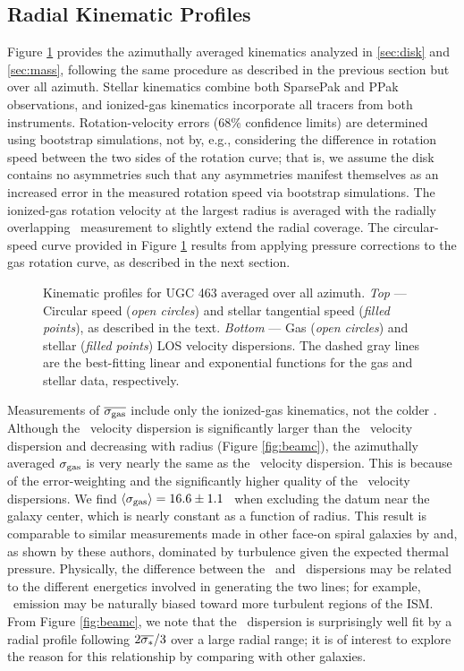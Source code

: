 \documentclass[apj,iop,numberedappendix]{emulateapj}
\begin{document}
\subsection{Radial Kinematic Profiles}
\label{sec:rcsdisp}

Figure \ref{fig:rcaxisym} provides the azimuthally averaged kinematics analyzed
in \sects \ref{sec:disk} and \ref{sec:mass}, following the same procedure as
described in the previous section but over all azimuth.  Stellar kinematics
combine both SparsePak and PPak observations, and ionized-gas kinematics
incorporate all tracers from both instruments.  Rotation-velocity errors (68\%
confidence limits) are determined using bootstrap simulations, not by, e.g.,
considering the difference in rotation speed between the two sides of the
rotation curve; that is, we assume the disk contains no asymmetries such that
any asymmetries manifest themselves as an increased error in the measured
rotation speed via bootstrap simulations.  The ionized-gas rotation velocity at
the largest radius is averaged with the radially overlapping \hone\ measurement
to slightly extend the radial coverage.  The circular-speed curve provided in
Figure \ref{fig:rcaxisym} results from applying pressure corrections to the gas
rotation curve, as described in the next section.

\begin{figure}
\caption{
%
Kinematic profiles for UGC 463 averaged over all azimuth.  {\it Top} ---
Circular speed ({\it open circles}) and stellar tangential speed ({\it filled
points}), as described in the text.  {\it Bottom} --- Gas ({\it open circles})
and stellar ({\it filled points}) LOS velocity dispersions.  The dashed gray
lines are the best-fitting linear and exponential functions for the gas and
stellar data, respectively.
%
}
\label{fig:rcaxisym}
\end{figure}

Measurements of $\overline{\sigma_{\rm gas}}$ include only the ionized-gas kinematics, not
the colder \hone.  Although the \oiii\ velocity dispersion is significantly
larger than the \halp\ velocity dispersion and decreasing with radius (Figure
\ref{fig:beamc}), the azimuthally averaged $\sigma_{\rm gas}$ is very nearly the same as
the \halp\ velocity dispersion.  This is because of the error-weighting and the
significantly higher quality of the \halp\ velocity dispersions.  We find
$\langle \sigma_{\rm gas} \rangle = 16.6\pm1.1$ \kms\ when excluding the datum near the galaxy
center, which is nearly constant as a function of radius.  This result is
comparable to similar measurements made in other face-on spiral galaxies by
\citet{2006ApJS..166..505A} and, as shown by these authors, dominated by
turbulence given the expected thermal pressure.  Physically, the difference
between the \halp\ and \oiii\ dispersions may be related to the different
energetics involved in generating the two lines; for example, \oiii\ emission
may be naturally biased toward more turbulent regions of the ISM.  From Figure
\ref{fig:beamc}, we note that the \oiii\ dispersion is surprisingly well fit by
a radial profile following $2\overline{\sigma_{\ast}}/3$ over a large radial range; it is
of interest to explore the reason for this relationship by comparing with other
galaxies.
\end{document}

